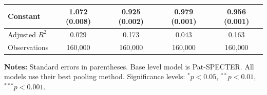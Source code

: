 \begin{table}[htbp]
\begin{tabular}{lcccc}
Constant & 1.072\sym{***} (0.008) & 0.925\sym{***} (0.002) & 0.979\sym{***} (0.001) & 0.956\sym{***} (0.001) \\
\midrule
Adjusted $R^2$ & 0.029 & 0.173 & 0.043 & 0.163 \\
Observations & 160,000 & 160,000 & 160,000 & 160,000 \\
\bottomrule
\end{tabular}
\begin{flushleft}\small
\textbf{Notes:} Standard errors in parentheses. Base level model is Pat-SPECTER. All models use their best pooling method. Significance levels: $^{*} p<0.05$, $^{**} p<0.01$, $^{***} p<0.001$.
\end{flushleft}
\end{table}
